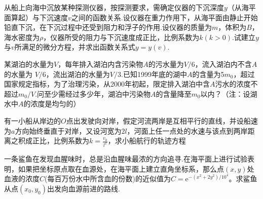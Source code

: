 \begin{xiti}
	\item 从船上向海中沉放某种探测仪器，按探测要求，需确定仪器的下沉深度$y$（从海平面算起）与下沉速度$v$之间的函数关系.设仪器在重力作用下，从海平面由静止开始铅直下沉，在下沉过程中还受到阻力和浮子的作用.设仪器的质量为$m$，体积为$B$，海水密度为$\rho$，仪器所受的阻力与下沉速度成正比，比例系数为$k(k>0)$.试建立$y$与$v$所满足的微分方程，并求出函数关系式$y=y(v)$.
		
	\item 某湖泊的水量为$V$，每年排入湖泊内含污染物$A$的污水量为$V/6$，流入湖泊内不含$A$的水量为
	$V/6$，流出湖泊的水量为$V/3$.已知1999年底的湖中$A$的含量为5$m_{0}$，超过国家规定指标，为了治理污染，从2000年初起，限定排入湖泊中含$A$污水的浓度不超过$m_{0}/V$.问至少需经过多少年，湖泊中污染物$A$的含量降至$m_{0}$以内？（注：设湖水中$A$的浓度是均匀的）
	
	\item 有一小船从岸边的$O$点出发驶向对岸，假定河流两岸是互相平行的直线，并设船速为$a$方向始终垂直于对岸，又设河宽为$2l$，河面上任一点处的水速与该点到两岸距离之积成正比，比例系数为$k=\frac{v_{0}}{l^{2}}$，求小船航行的轨迹方程
	\item 一条鲨鱼在发现血腥味时，总是沿血腥味最浓的方向追寻.在海平面上进行试验表明，如果把坐标原点取在血源处，在海平面上建立直角坐标系，那么点$(x,y)$处血液的浓度$C$(每百万份水中所含血的份数)的近似值为$C=\mathrm{e}^{-\left(x^{2}+2 y^{2}\right) / 10^{4}}$。求鲨鱼从点$(x_{0},y_{0})$出发向血源前进的路线.
	
\end{xiti}


